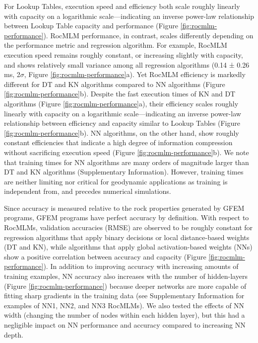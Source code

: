\documentclass[draft,linenumbers]{agujournal2018}
\begin{document}
For Lookup Tables, execution speed and efficiency both scale roughly linearly with capacity on a logarithmic scale---indicating an inverse power-law relationship between Lookup Table capacity and performance (Figure \ref{fig:rocmlm-performance}). RocMLM performance, in contrast, scales differently depending on the performance metric and regression algorithm. For example, RocMLM execution speed remains roughly constant, or increasing slightly with capacity, and shows relatively small variance among all regression algorithms (0.14 ± 0.26 ms, 2\(\sigma\), Figure \ref{fig:rocmlm-performance}a). Yet RocMLM efficiency is markedly different for DT and KN algorithms compared to NN algorithms (Figure \ref{fig:rocmlm-performance}b). Despite the fast execution times of KN and DT algorithms (Figure \ref{fig:rocmlm-performance}a), their efficiency scales roughly linearly with capacity on a logarithmic scale---indicating an inverse power-law relationship between efficiency and capacity similar to Lookup Tables (Figure \ref{fig:rocmlm-performance}b). NN algorithms, on the other hand, show roughly constant efficiencies that indicate a high degree of information compression without sacrificing execution speed (Figure \ref{fig:rocmlm-performance}b). We note that training times for NN algorithms are many orders of magnitude larger than DT and KN algorithms (Supplementary Information). However, training times are neither limiting nor critical for geodynamic applications as training is independent from, and precedes numerical simulations.

Since accuracy is measured relative to the rock properties generated by GFEM programs, GFEM programs have perfect accuracy by definition. With respect to RocMLMs, validation accuracies (RMSE) are observed to be roughly constant for regression algorithms that apply binary decisions or local distance-based weights (DT and KN), while algorithms that apply global activation-based weights (NNs) show a positive correlation between accuracy and capacity (Figure \ref{fig:rocmlm-performance}). In addition to improving accuracy with increasing amounts of training examples, NN accuracy also increases with the number of hidden-layers (Figure \ref{fig:rocmlm-performance}) because deeper networks are more capable of fitting sharp gradients in the training data (see Supplementary Information for examples of NN1, NN2, and NN3 RocMLMs). We also tested the effects of NN width (changing the number of nodes within each hidden layer), but this had a negligible impact on NN performance and accuracy compared to increasing NN depth.
\end{document}
